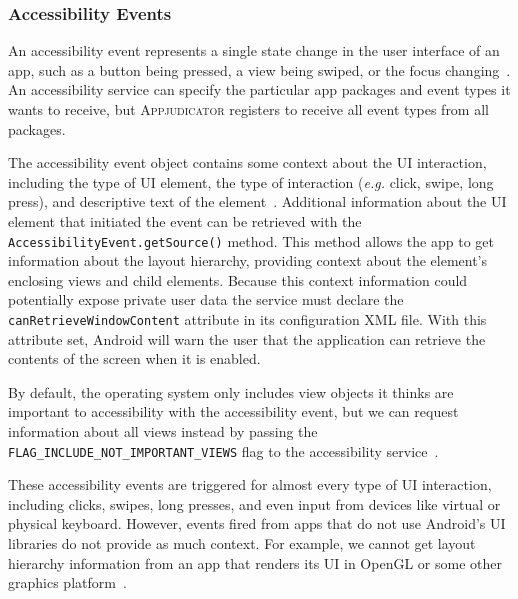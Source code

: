 \subsubsection{Accessibility Events}
\label{sec:accessibility-events}

An accessibility event represents a single state change in the user interface of
an app, such as a button being pressed, a view being swiped, or the focus
changing~\cite{accessibilityserviceguide}. An accessibility service can specify
the particular app packages and event types it wants to receive, but
\textsc{Appjudicator} registers to receive all event types from all packages.

The accessibility event object contains some context about the UI interaction,
including the type of UI element, the type of interaction (\textit{e.g.} click,
swipe, long press), and descriptive text of the
element~\cite{accessibilityserviceguide}. Additional information about the UI
element that initiated the event can be retrieved with the
\texttt{AccessibilityEvent.getSource()} method. This method allows the app to
get information about the layout hierarchy, providing context about the
element's enclosing views and child elements. Because this context information
could potentially expose private user data the service must declare the
\texttt{canRetrieveWindowContent} attribute in its configuration XML file. With
this attribute set, Android will warn the user that the application can retrieve
the contents of the screen when it is enabled.

By default, the operating system only includes view objects it thinks are
important to accessibility with the accessibility event, but we can request
information about all views instead by passing the 
\texttt{FLAG\_INCLUDE\_NOT\_IMPORTANT\_VIEWS} flag to the accessibility
service~\cite{accessibilityserviceguide}.


These accessibility events are triggered for almost every type of UI interaction,
including clicks, swipes, long presses, and even input from devices like virtual
or physical keyboard. However, events fired from apps that do not use Android's
UI libraries do not provide as much context. For example, we cannot get layout
hierarchy information from an app that renders its UI in OpenGL or some other
graphics platform~\cite{accessibilityserviceguide}.


